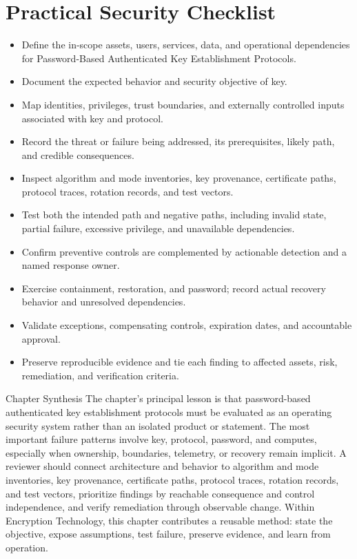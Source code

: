 \documentclass[11pt,letterpaper]{article}
\begin{document}
\section*{Practical Security Checklist}
\begin{itemize}[label=$\square$]
\item Define the in-scope assets, users, services, data, and operational dependencies for Password-Based Authenticated Key Establishment Protocols.
\item Document the expected behavior and security objective of key.
\item Map identities, privileges, trust boundaries, and externally controlled inputs associated with key and protocol.
\item Record the threat or failure being addressed, its prerequisites, likely path, and credible consequences.
\item Inspect algorithm and mode inventories, key provenance, certificate paths, protocol traces, rotation records, and test vectors.
\item Test both the intended path and negative paths, including invalid state, partial failure, excessive privilege, and unavailable dependencies.
\item Confirm preventive controls are complemented by actionable detection and a named response owner.
\item Exercise containment, restoration, and password; record actual recovery behavior and unresolved dependencies.
\item Validate exceptions, compensating controls, expiration dates, and accountable approval.
\item Preserve reproducible evidence and tie each finding to affected assets, risk, remediation, and verification criteria.
\end{itemize}
\begin{CornellSummaryBox}{Chapter Synthesis}
The chapter's principal lesson is that password-based authenticated key establishment protocols must be evaluated as an operating security system rather than an isolated product or statement. The most important failure patterns involve key, protocol, password, and computes, especially when ownership, boundaries, telemetry, or recovery remain implicit. A reviewer should connect architecture and behavior to algorithm and mode inventories, key provenance, certificate paths, protocol traces, rotation records, and test vectors, prioritize findings by reachable consequence and control independence, and verify remediation through observable change. Within Encryption Technology, this chapter contributes a reusable method: state the objective, expose assumptions, test failure, preserve evidence, and learn from operation.
\end{CornellSummaryBox}
\end{document}
